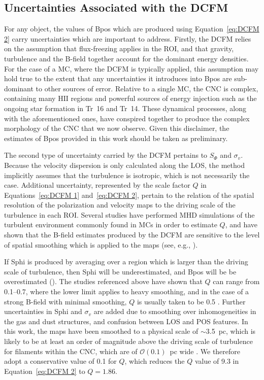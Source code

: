 \subsection{Uncertainties Associated with the DCFM}\label{DCFM limitations}

For any object, the values of \gls{Bpos} which are produced using Equation~\ref{eq:DCFM 2} carry uncertainties which are important to address. Firstly, the DCFM relies on the assumption that flux-freezing applies in the ROI, and that gravity, turbulence and the B-field together account for the dominant energy densities. For the case of a MC, where the DCFM is typically applied, this assumption may hold true to the extent that any uncertainties it introduces into \gls{Bpos} are sub-dominant to other sources of error. Relative to a single MC, the CNC is complex, containing many $\mathrm{HII}$ regions and powerful sources of energy injection such as the ongoing star formation in Tr~16 and Tr~14. These dynamical processes, along with the aforementioned ones, have conspired together to produce the complex morphology of the CNC that we now observe. Given this disclaimer, the estimates of \gls{Bpos} provided in this work should be taken as preliminary.

The second type of uncertainty carried by the DCFM pertains to $S_{\Phi}$ and $\sigma_{v}$. Because the velocity dispersion is only calculated along the LOS, the method implicitly assumes that the turbulence is isotropic, which is not necessarily the case. Additional uncertainty, represented by the scale factor $Q$ in Equations~\ref{eq:DCFM 1} and~\ref{eq:DCFM 2}, pertain to the relation of the spatial resolution of the polarization and velocity maps to the driving scale of the turbulence in each ROI. Several studies have performed MHD simulations of the turbulent environment commonly found in MCs in order to estimate $Q$, and have shown that the B-field estimates produced by the DCFM are sensitive to the level of spatial smoothing which is applied to the maps (see, e.g., \citet{ostriker2001density,padoan2001theoretical,heitsch2001magnetic,kudoh2003nonlinear}).


If \gls{Sphi} is produced by averaging over a region which is larger than the driving scale of turbulence, then \gls{Sphi} will be underestimated, and \gls{Bpos} will be be overestimated (\citet{cho2016technique}). The studies referenced above have shown that $Q$ can range from 0.1--0.7, where the lower limit applies to heavy smoothing, and in the case of a strong B-field with minimal smoothing, $Q$ is usually taken to be 0.5 \citep{houde2004evaluating}. Further uncertainties in \gls{Sphi} and $\sigma_{v}$ are added due to smoothing over inhomogeneities in the gas and dust structures, and confusion between LOS and POS features. In this work, the maps have been smoothed to a physical scale of $\sim$3.5~pc, which is likely to be at least an order of magnitude above the driving scale of turbulence for filaments within the CNC, which are of $\mathcal{O}(0.1)$~pc wide \citep{preibisch2012herschel}. We therefore adopt a conservative value of 0.1 for $Q$, which reduces the $Q$ value of 9.3 in Equation~\ref{eq:DCFM 2} to $Q = 1.86$.

